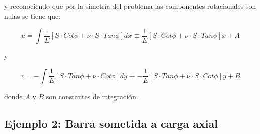 \documentclass[../notas medios.tex]{subfiles}
\begin{document}
y reconociendo que por la simetría del problema las componentes rotacionales son nulas se tiene que:

\[u = \int {\frac{1}{E}\left[ {S \cdot Cot\phi  + \nu  \cdot S \cdot Tan\phi } \right]dx}  \equiv \frac{1}{E}\left[ {S \cdot Cot\phi  + \nu  \cdot S \cdot Tan\phi } \right]x + A\]

y

\[v =  - \int {\frac{1}{E}\left[ {S \cdot Tan\phi  + \nu  \cdot Cot\phi } \right]dy}  \equiv  - \frac{1}{E}\left[ {S \cdot Tan\phi  + \nu  \cdot S \cdot Cot\phi } \right]y + B\]

donde $A$ y $B$ son constantes de integración.


\subsection*{Ejemplo 2: Barra sometida a carga axial}
\end{document}
